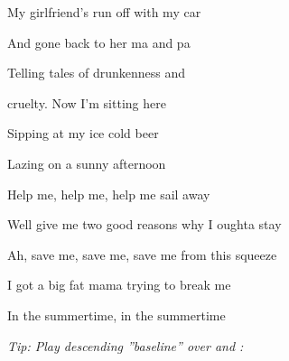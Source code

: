 \begin{song}
\bigskip

My girlfriend's run off with my car \par
And gone back to her ma and pa \par
{}Telling tales of drunkenness and \par
{}cruelty. Now I'm sitting here \par
{}Sipping at my ice cold beer \par
{}Lazing on a sunny afternoon \par

\bigskip

Help me, help me, help me sail away \par
Well give me two good reasons why I oughta stay  \par

\bigskip

\Chorus

\bigskip

Ah, save me, save me, save me from this squeeze \par
I got a big fat mama trying to break me  \par

\bigskip

\Chorus

\bigskip

In the summertime, in the summertime \par
{} \par


\vfill

{\smaller\it
Tip: Play descending ''baseline'' over  and :
}

\bigskip

\small


\end{song}
